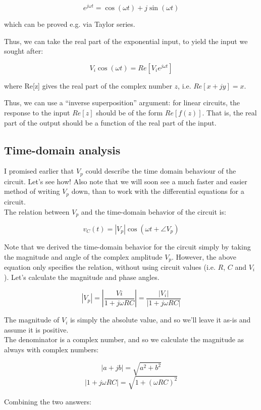 \documentclass[12pt,a4paper]{report}
\begin{document}
\[ e^{j \omega t} = \cos{(\omega t)} + j \sin{(\omega t)} \]

which can be proved e.g. via Taylor series.

Thus, we can take the real part of the exponential input, to yield the input we sought after:

\[ V_i \cos{(\omega t)} = Re\left[ V_i e^{j \omega t} \right] \]

where Re[z] gives the real part of the complex number $z$, i.e. $Re[x + jy] = x$.

Thus, we can use a ``inverse superposition'' argument: for linear circuits, the response to the input $Re[z]$ should be of the form $Re[f(z)]$. That is, the real part of the output should be a function of the real part of the input.\\

\subsection{Time-domain analysis}

I promised earlier that $V_p$ could describe the time domain behaviour of the circuit. Let's see how! Also note that we will soon see a much faster and easier method of writing $V_p$ down, than to work with the differential equations for a circuit.\\

The relation between $V_p$ and the time-domain behavior of the circuit is:

\[ v_C(t) = \left| V_p \right| \cos{(\omega t + \angle V_p)} \]

Note that we derived the time-domain behavior for the circuit simply by taking the magnitude and angle of the complex amplitude $V_p$. However, the above equation only specifies the relation, without using circuit values (i.e. $R$, $C$ and $V_i$). Let's calculate the magnitude and phase angles.

\[ | V_p | = \left| \frac{Vi}{1 + j \omega RC} \right| = \frac{|V_i|}{|1 + j \omega RC|} \]

The magnitude of $V_i$ is simply the absolute value, and so we'll leave it as-is and assume it is positive.\\
The denominator is a complex number, and so we calculate the magnitude as always with complex numbers:

\[ |a + jb| = \sqrt{a^2 + b^2} \]
\[ |1 + j \omega R C| = \sqrt{1 + (\omega R C)^2} \]

Combining the two answers:
\end{document}

